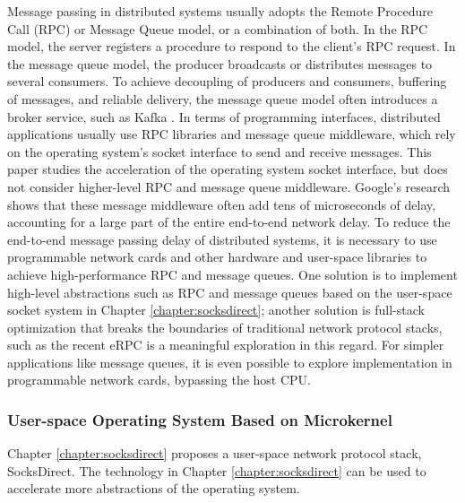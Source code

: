 Message passing in distributed systems usually adopts the Remote Procedure Call (RPC) or Message Queue model, or a combination of both. In the RPC model, the server registers a procedure to respond to the client's RPC request. In the message queue model, the producer broadcasts or distributes messages to several consumers. To achieve decoupling of producers and consumers, buffering of messages, and reliable delivery, the message queue model often introduces a broker service, such as Kafka \cite{kreps2011kafka}. In terms of programming interfaces, distributed applications usually use RPC libraries and message queue middleware, which rely on the operating system's socket interface to send and receive messages.
This paper studies the acceleration of the operating system socket interface, but does not consider higher-level RPC and message queue middleware. Google's research \cite{barroso2017attack} shows that these message middleware often add tens of microseconds of delay, accounting for a large part of the entire end-to-end network delay.
To reduce the end-to-end message passing delay of distributed systems, it is necessary to use programmable network cards and other hardware and user-space libraries to achieve high-performance RPC and message queues.
One solution is to implement high-level abstractions such as RPC and message queues based on the user-space socket system in Chapter \ref{chapter:socksdirect}; another solution is full-stack optimization that breaks the boundaries of traditional network protocol stacks, such as the recent eRPC \cite{kalia2018datacenter} is a meaningful exploration in this regard.
For simpler applications like message queues, it is even possible to explore implementation in programmable network cards, bypassing the host CPU.

\subsubsection{User-space Operating System Based on Microkernel}
\label{future:user-space-os}

Chapter \ref{chapter:socksdirect} proposes a user-space network protocol stack, SocksDirect. The technology in Chapter \ref{chapter:socksdirect} can be used to accelerate more abstractions of the operating system.

